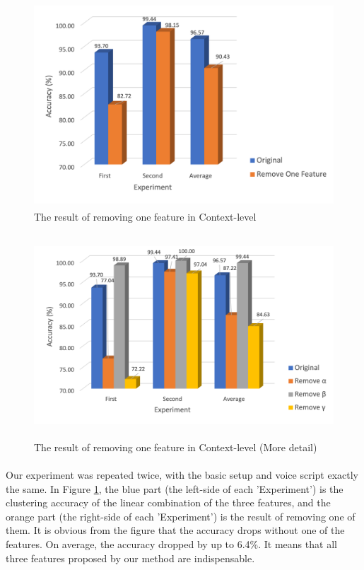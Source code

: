 \documentclass[a4paper,12pt]{report}
\begin{document}
\begin{figure}[btph]
\begin{center}
\includegraphics[width=4.87in,height=3in]{images and data/Result_Reduce1Feature.png}
\caption{The result of removing one feature in Context-level}
\label{f:Result_Reduce1Feature}
\end{center}
\end{figure}

\begin{figure}[btph]
\begin{center}
\includegraphics[width=5.04in,height=3in]{images and data/Result_Reduce3Feature.png}
\caption{The result of removing one feature in Context-level (More detail)}
\label{f:Result_Reduce3Feature}
\end{center}
\end{figure}

\paragraph{}
Our experiment was repeated twice, with the basic setup and voice script exactly the same. In Figure \ref{f:Result_Reduce1Feature}, the blue part (the left-side of each 'Experiment') is the clustering accuracy of the linear combination of the three features, and the orange part (the right-side of each 'Experiment') is the result of removing one of them. It is obvious from the figure that the accuracy drops without one of the features. On average, the accuracy dropped by up to 6.4\%. It means that all three features proposed by our method are indispensable.
\end{document}
